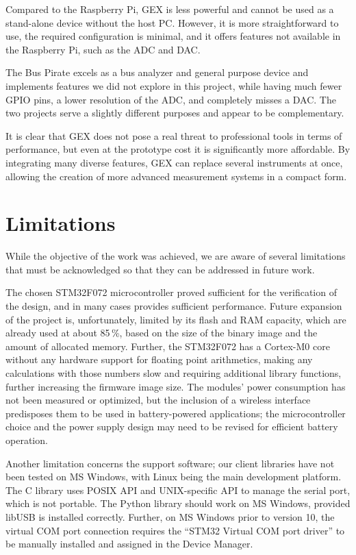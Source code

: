Compared to the Raspberry Pi, GEX is less powerful and cannot be used as a stand-alone device without the host \gls{PC}. However, it is more straightforward to use, the required configuration is minimal, and it offers features not available in the Raspberry Pi, such as the \gls{ADC} and \gls{DAC}.

The Bus Pirate excels as a bus analyzer and general purpose device and implements features we did not explore in this project, while having much fewer \gls{GPIO} pins, a lower resolution of the \gls{ADC}, and completely misses a \gls{DAC}. The two projects serve a slightly different purposes and appear to be complementary.

It is clear that GEX does not pose a real threat to professional tools in terms of performance, but even at the prototype cost it is significantly more affordable. By integrating many diverse features, GEX can replace several instruments at once, allowing the creation of more advanced measurement systems in a compact form.

\section{Limitations}

While the objective of the work was achieved, we are aware of several limitations that must be acknowledged so that they can be addressed in future work.

The chosen STM32F072 microcontroller proved sufficient for the verification of the design, and in many cases provides sufficient performance. Future expansion of the project is, unfortunately, limited by its flash and \gls{RAM} capacity, which are already used at about 85\,\%, based on the size of the binary image and the amount of allocated memory. Further, the STM32F072 has a Cortex-M0 core without any hardware support for floating point arithmetics, making any calculations with those numbers slow and requiring additional library functions, further increasing the firmware image size. The modules' power consumption has not been measured or optimized, but the inclusion of a wireless interface predisposes them to be used in battery-powered applications; the microcontroller choice and the power supply design may need to be revised for efficient battery operation.

Another limitation concerns the support software; our client libraries have not been tested on MS Windows, with Linux being the main development platform. The C library uses POSIX \gls{API} and UNIX-specific \gls{API} to manage the serial port, which is not portable. The Python library should work on MS Windows, provided libUSB is installed correctly. Further, on MS Windows prior to version 10, the virtual COM port connection requires the ``STM32 Virtual COM port driver'' to be manually installed and assigned in the Device Manager. 

